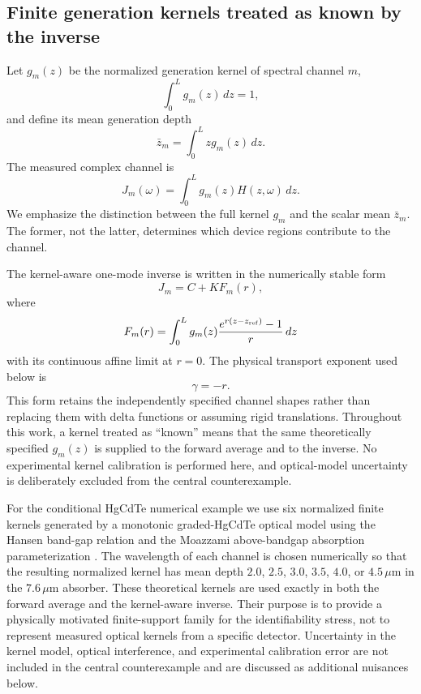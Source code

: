 \documentclass[aps,pra,twocolumn,superscriptaddress,nofootinbib]{revtex4-2}
\begin{document}
\subsection{Finite generation kernels treated as known by the inverse}

Let $g_m(z)$ be the normalized generation kernel of spectral channel $m$,
\begin{equation}
\int_0^L g_m(z)\,dz=1,
\end{equation}
and define its mean generation depth
\begin{equation}
\bar z_m=\int_0^L z g_m(z)\,dz.
\end{equation}
The measured complex channel is
\begin{equation}
\boxed{
J_m(\omega)=\int_0^L g_m(z)H(z,\omega)\,dz.
}
\label{eq:channel}
\end{equation}
We emphasize the distinction between the full kernel $g_m$ and the scalar mean $\bar z_m$. The former, not the latter, determines which device regions contribute to the channel.

The kernel-aware one-mode inverse is written in the numerically stable form
\begin{equation}
J_m=C+K F_m(r),
\label{eq:onemode}
\end{equation}
where
\begin{equation}
F_m(r)=\int_0^L g_m(z)
\frac{e^{r(z-z_{\rm ref})}-1}{r}\,dz
\end{equation}
with its continuous affine limit at $r=0$. The physical transport exponent used below is
\begin{equation}
\gamma=-r.
\end{equation}
This form retains the independently specified channel shapes rather than replacing them with delta functions or assuming rigid translations.  Throughout this work, a kernel treated as ``known'' means that the same theoretically specified $g_m(z)$ is supplied to the forward average and to the inverse.  No experimental kernel calibration is performed here, and optical-model uncertainty is deliberately excluded from the central counterexample.

For the conditional HgCdTe numerical example we use six normalized finite kernels generated by a monotonic graded-HgCdTe optical model using the Hansen band-gap relation and the Moazzami above-bandgap absorption parameterization \cite{hansen1982gap,moazzami2005absorption}.  The wavelength of each channel is chosen numerically so that the resulting normalized kernel has mean depth $2.0$, $2.5$, $3.0$, $3.5$, $4.0$, or $4.5\,\mu\mathrm{m}$ in the $7.6\,\mu\mathrm{m}$ absorber.  These theoretical kernels are used exactly in both the forward average and the kernel-aware inverse.  Their purpose is to provide a physically motivated finite-support family for the identifiability stress, not to represent measured optical kernels from a specific detector.  Uncertainty in the kernel model, optical interference, and experimental calibration error are not included in the central counterexample and are discussed as additional nuisances below.
\end{document}
